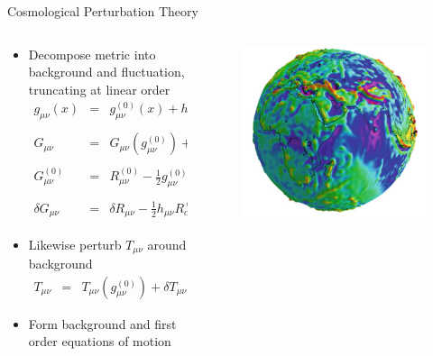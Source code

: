 \documentclass[8pt,aspectratio=1610]{beamer}
\begin{document}
\begin{frame}{Cosmological Perturbation Theory}
	\begin{columns}
		\begin{column}{0.7\linewidth}
			\begin{itemize}
			\item Decompose metric into background and fluctuation, truncating at linear order
			\begin{eqnarray}
				g_{\mu\nu}(x) &=& g_{\mu\nu}^{(0)}(x) + h_{\mu\nu}(x),\qquad g^{\mu\nu}_{(0)}h_{\mu\nu} \equiv h
				\\ \nonumber\\
				G_{\mu\nu} &=& G_{\mu\nu}(g_{\mu\nu}^{(0)}) + \delta G_{\mu\nu}(h_{\mu\nu})
				\\ \nonumber\\
				G_{\mu\nu}^{(0)} &=& R_{\mu\nu}^{(0)} -\frac{1}{2} g_{\mu\nu}^{(0)} R_\alpha^{(0)\alpha}
				\label{Einzero}
				\\ \nonumber\\
				\delta G_{\mu\nu} &=& \delta R_{\mu\nu} - \frac{1}{2} h_{\mu\nu} R_\alpha^{(0)\alpha} -\frac{1}{2}g_{\mu\nu}\delta R^\alpha{}_\alpha.
			\end{eqnarray}
			\item Likewise perturb $T_{\mu\nu}$ around background
			\begin{eqnarray}
				T_{\mu\nu} &=& T_{\mu\nu}(g_{\mu\nu}^{(0)}) + \delta T_{\mu\nu}(h_{\mu\nu})
			\end{eqnarray}
			\item Form background and first order equations of motion
			\end{itemize}
		\end{column}
		\begin{column}{0.3\linewidth}
			\begin{figure}[t]
				\includegraphics[width=\linewidth]{sphere_perturb.png}

\end{figure}
\end{column}
\end{columns}
\end{frame}
\end{document}
